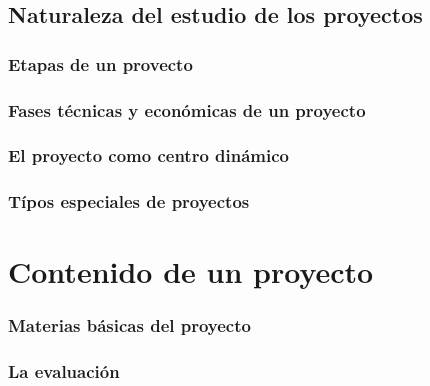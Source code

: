 \documentclass[crop=false]{standalone}
\begin{document}
\blindtext

\subsection{Naturaleza del estudio de los proyectos}

\subsubsection{Etapas de un provecto}

\blindtext

\subsubsection{Fases técnicas y económicas de un proyecto}

\blindtext

\subsubsection{El proyecto como centro dinámico}

\blindtext

\subsubsection{Típos especiales de proyectos}

\blindtext

\section{ Contenido de un proyecto}

\subsubsection{ Materias básicas del proyecto}

\subsubsection{La evaluación}

\end{document}
